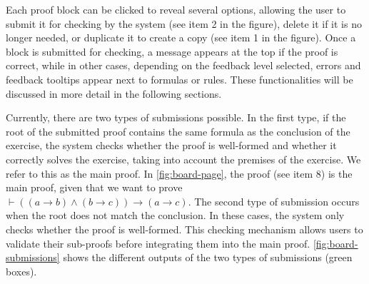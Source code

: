Each proof block can be clicked to reveal several options, allowing the user to submit it for checking by the system (see item 2 in the figure), delete it if it is no longer needed, or duplicate it to create a copy (see item 1 in the figure). Once a block is submitted for checking, a message appears at the top if the proof is correct, while in other cases, depending on the feedback level selected, errors and feedback tooltips appear next to formulas or rules. These functionalities will be discussed in more detail in the following sections.

Currently, there are two types of submissions possible. In the first type, if the root of the submitted proof contains the same formula as the conclusion of the exercise, the system checks whether the proof is well-formed and whether it correctly solves the exercise, taking into account the premises of the exercise. We refer to this as the main proof. In \autoref{fig:board-page}, the proof (see item 8) is the main proof, given that we want to prove \(\vdash ((a \to b) \land (b \to c)) \to (a \to c)\). The second type of submission occurs when the root does not match the conclusion. In these cases, the system only checks whether the proof is well-formed. This checking mechanism allows users to validate their sub-proofs before integrating them into the main proof. \autoref{fig:board-submissions} shows the different outputs of the two types of submissions (green boxes).

